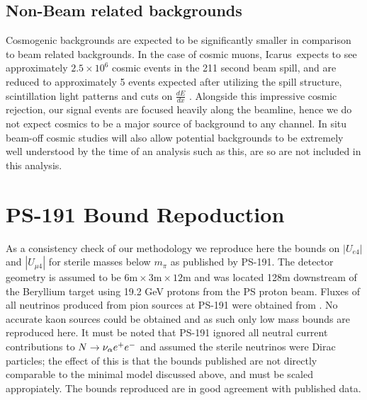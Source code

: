 \documentclass[11pt, a4paper]{article}
\def\icarus{Icarus}
\def\ster{\ensuremath N}
\begin{document}
\subsection{Non-Beam related backgrounds}

Cosmogenic backgrounds are expected to be significantly smaller in comparison
to beam related backgrounds. In the case of cosmic muons, \icarus\ expects to
see approximately $2.5 \times 10^{6}$ cosmic events in the 211 second beam
spill, and are reduced to approximately 5 events expected after utilizing the
spill structure, scintillation light patterns and cuts on $\frac{d E}{d x}$
\cite{Antonello:2015lea}.  Alongside this impressive cosmic rejection, our
signal events are focused heavily along the beamline, hence we do not expect
cosmics to be a major source of background to any channel. In situ beam-off
cosmic studies will also allow potential backgrounds to be extremely well
understood by the time of an analysis such as this, are so are not included in
this analysis. 

\section{PS-191 Bound Repoduction\label{sec:ps191}}

As a consistency check of our methodology we reproduce here the bounds on
$|U_{e4}|$ and $|U_{\mu 4}|$ for sterile masses below $m_\pi$ as published by
PS-191. The detector geometry is assumed to be $6\text{m} \times 3\text{m}
\times 12 \text{m}$ and was located 128m downstream of the Beryllium target
using 19.2 GeV protons from the PS proton beam.  Fluxes of all neutrinos
produced from pion sources at PS-191 were obtained from \cite{ps191THesis}. No
accurate kaon sources could be obtained and as such only low mass bounds are
reproduced here. It must be noted that PS-191 ignored all neutral current
contributions to $\ster \rightarrow \nu_\alpha e^+ e^-$ and assumed the sterile
neutrinos were Dirac particles; the effect of this is that the bounds published
are not directly comparable to the minimal model discussed above, and must be
scaled appropiately. The bounds reproduced are in good agreement with published
data.
\end{document}
